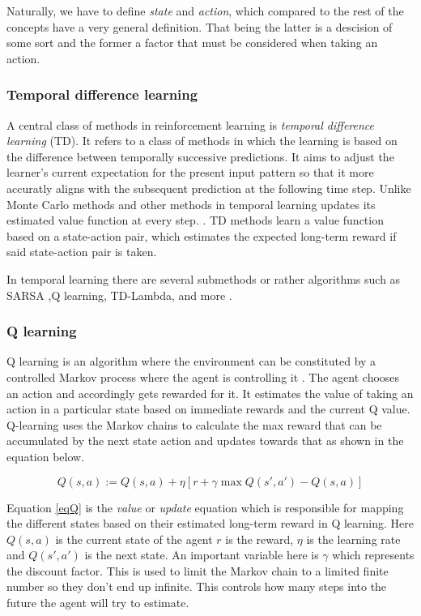 Naturally, we have to define \textit{state} and \textit{action}, which compared to the rest of the concepts have a very general definition. That being the latter is a descision of some sort and the former a factor that must be considered when taking an action. 

\subsubsection{Temporal difference learning}

A central class of methods in reinforcement learning is \textit{temporal difference learning} (TD). It refers to a class of methods in which the learning is based on the difference between temporally successive predictions. It aims to adjust the learner's current expectation for the present input pattern so that it more accuratly aligns with the subsequent prediction at the following time step. Unlike Monte Carlo methods and other methods in temporal learning updates its estimated value function at every step. \cite{tesauro1995temporal}.  TD methods learn a value function based on a state-action pair, which estimates the expected long-term reward if said state-action pair is taken. 

In temporal learning there are several submethods or rather algorithms such as SARSA ,Q learning, TD-Lambda, and more \cite{eiben2007reinforcement}.\\

\subsubsection{Q learning}
Q learning is an algorithm where the environment can be constituted by a controlled Markov process where the agent is controlling it \cite{watkins1992q}. The agent chooses an action and accordingly gets rewarded for it. It estimates the value of taking an action in a particular state based on immediate rewards and the current Q value. Q-learning uses the Markov chains to calculate the max reward that can be accumulated by the next state action and updates towards that as shown in the equation below.

\begin{equation} \label{eqQ}
    { Q(s,a) := Q(s,a) + \eta [r + \gamma \max Q(s',a') - Q(s,a)]}
\end{equation}

Equation \ref{eqQ} is the \textit{value} or \textit{update} equation which is responsible for mapping the different states based on their estimated long-term reward in Q learning. Here $Q(s,a)$ is the current state of the agent $r$ is the reward, $\eta$ is the learning rate and $Q(s',a')$ is the next state. An important variable here is $\gamma$ which represents the discount factor. This is used to limit the Markov chain to a limited finite number so they don't end up infinite. This controls how many steps into the future the agent will try to estimate. 


